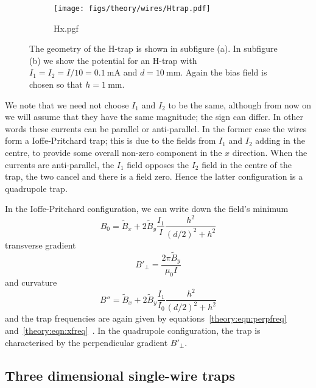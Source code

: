 \begin{figure}[htb]
  \centering
  \begin{subfigure}[b]{0.4\textwidth}
    \texttt{[image: figs/theory/wires/Htrap.pdf]}
  \end{subfigure}
  \begin{subfigure}[b]{0.4\textwidth}
    {Hx.pgf}
  \end{subfigure}
  \caption{The geometry of the H-trap is shown in subfigure (a). In subfigure
  (b) we show the potential for an H-trap with
  $I_1=I_2=I/10=\SI{0.1}{\milli\ampere}$ and $d=\SI{10}{\milli\meter}$. Again the bias field is chosen so
  that $h=\SI{1}{\milli\meter}$.}
  \label{theory:fig:Htrap}
\end{figure}

We note that we need not choose $I_1$ and $I_2$ to be the same, although from
now on we will assume that they have the same magnitude; the sign can differ.
In other words these currents can be parallel or anti-parallel. In the former
case the wires form a Ioffe-Pritchard trap; this is due to the fields from
$I_1$ and $I_2$ adding in the centre, to provide some overall non-zero
component in the $x$ direction. When the currents are anti-parallel, the $I_1$
field opposes the $I_2$ field in the centre of the trap, the two cancel and
there is a field zero. Hence the latter configuration is a quadrupole trap.

In the Ioffe-Pritchard configuration, we can write down the field's
minimum
%
\begin{equation}
  B_0 = \tilde{B}_x + 2\tilde{B}_y \frac{I_1}{I}\frac{h^2}{(d/2)^2 + h^2}
\end{equation}
%
transverse gradient
%
\begin{equation}
  B'_\perp = \frac{2\pi\tilde{B}_y}{\mu_0 I}
\end{equation}
%
and curvature~\cite{PhysRevA.79.013407}
%
\begin{equation}
  B'' = \tilde{B}_x + 2\tilde{B}_y\frac{I_1}{I_0}\frac{h^2}{(d/2)^2+h^2}
\end{equation}
%
and the trap frequencies are again given by equations~\ref{theory:eqn:perpfreq}
and~\ref{theory:eqn:xfreq}~\cite{PhysRevA.79.013407}. In the quadrupole
configuration, the trap is characterised by the perpendicular gradient
$B'_\perp$. 

\subsection{Three dimensional single-wire traps}

